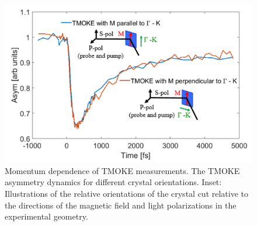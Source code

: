\begin{figure}[htbp]
	\begin{center}
		\includegraphics[width=150mm]{figs/NiFigS7}
	\end{center}
	\caption{Momentum dependence of TMOKE measurements. The TMOKE asymmetry dynamics for different crystal orientations. Inset:  Illustrations of the relative orientations of the crystal cut relative to the directions of the magnetic field and light polarizations in the experimental geometry.}
	\label{fig: NiSIfig7}
\end{figure}

